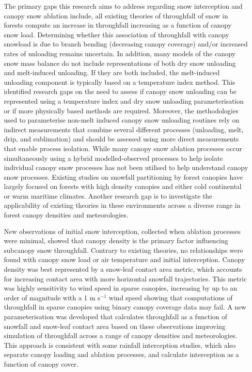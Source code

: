 {The primary gaps this research aims to address regarding snow interception and canopy snow ablation include, all existing theories of throughfall of snow in forests compute an increase in throughfall increasing as a function of canopy snow load. Determining whether this association of throughfall with canopy snowload is due to branch bending (decreasing canopy coverage) and/or increased rates of unloading remains uncertain.  In addition, many models of the canopy snow mass balance do not include representations of both dry snow unloading and melt-induced unloading. If they are both included, the melt-induced unloading component is typically based on a temperature index method. This identified research gaps on the need to assess if canopy snow unloading can be represented using a temperature index and dry snow unloading parameterisation or if more physically based methods are required. Moreover, the methodologies used to parameterise non-melt induced canopy snow unloading routines rely on indirect measurements that combine several different processes (unloading, melt, drip, and sublimation) and should be assessed using more direct measurements that enable process isolation. While many canopy snow ablation processes occur simultaneously using a hybrid modelled-observed processes to help isolate individual canopy snow processes has not been utilised to help understand canopy snow processes. Existing studies on snowfall partitioning by forest canopies have largely focused on forests with high density canopies and either cold continental or warm maritime climates. Another research gap is to investigate the applicability of existing theories in these environments across a diverse range in forest canopy densities and meteorologies. 

New observations of initial snow interception, collected when ablation processes were minimal, showed that canopy density is the primary factor influencing subcanopy snow throughfall. Contrary to existing theories, no relationships were found with canopy snow load or air temperature and initial interception. Canopy density was best represented by a snow-leaf contact area metric, which accounts for increasing contact area with more horizontal snowfall trajectories. This metric was highly sensitivity to wind speed in sparse canopies, increasing by up to an order of magnitude with a 1 m s$^{-1}$ wind speed showing that computations of throughfall in sparse canopies using binary canopy coverage data may fail. A new parameterisation was developed that calculates throughfall as a function of snowfall and snow-leaf contact area based on these observations improving simulation of throughfall across a range of canopy densities and meteorologies. This approach is consistent with some rainfall interception studies, which also separate canopy loading and ablation processes, and calculate interception as a function of canopy cover.

}
